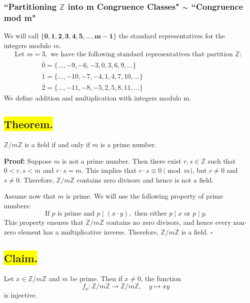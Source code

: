         \subsubsection*{``Partitioning $\mathbb{Z}$ into  m  Congruence Classes" $\thicksim$ ``Congruence mod m"}
            \qquad We will call $\boldsymbol{\{0,1,2,3,4,5,\ldots,m-1\}}$ the standard representatives for the integers modulo $m$.\\
                \[\begin{aligned}
                    &\text{Let } m = 3, \text{ we have the following standard representatives that partition } \mathbb{Z}: \\
                    &\qquad \qquad  \overline{0} = \{ \ldots, -9, -6, -3, 0, 3, 6, 9, \ldots \} \\
                    &\qquad \qquad \overline{1} = \{ \ldots, -10, -7, -4, 1, 4, 7, 10, \ldots \} \\
                    &\qquad \qquad \overline{2} = \{ \ldots, -11, -8, -5, 2, 5, 8, 11, \ldots \}
                \end{aligned}\]
            \newline
                We define addition and multiplication with integers modulo m.






\subsection*{\colorbox{yellow}{Theorem.}}
\( \mathbb{Z}/m\mathbb{Z} \) is a field if and only if \( m \) is a prime number.

\textbf{Proof:} Suppose \( m \) is not a prime number. Then there exist \( r, s \in \mathbb{Z} \) such that \( 0 < r, s < m \) and \( r \cdot s = m \). This implies that \( r \cdot s \equiv 0 \pmod{m} \), but \( r \neq 0 \) and \( s \neq 0 \). Therefore, \( \mathbb{Z}/m\mathbb{Z} \) contains zero divisors and hence is not a field.

Assume now that \( m \) is prime. We will use the following property of prime numbers: 
\[
\text{If } p \text{ is prime and } p \mid (x \cdot y), \text{ then either } p \mid x \text{ or } p \mid y.
\]
This property ensures that \( \mathbb{Z}/m\mathbb{Z} \) contains no zero divisors, and hence every non-zero element has a multiplicative inverse. Therefore, \( \mathbb{Z}/m\mathbb{Z} \) is a field. \(\square\)


\subsection*{\colorbox{yellow}{Claim.}}
Let \( x \in \mathbb{Z}/m\mathbb{Z} \) and \( m \) be prime. Then if \( x \neq 0 \), the function
\[
f_x: \mathbb{Z}/m\mathbb{Z} \to \mathbb{Z}/m\mathbb{Z}, \quad y \mapsto xy
\]
is injective.

